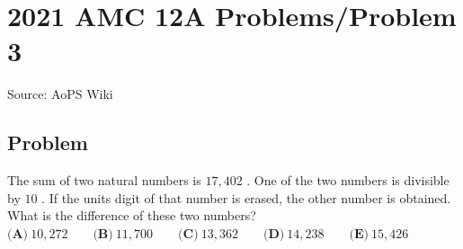 \documentclass[12pt]{article}
\begin{document}
\section*{{2021 AMC 12A Problems/Problem 3}}
Source: AoPS Wiki

\subsection*{Problem}
The sum of two natural numbers is $17{,}402$ . One of the two numbers is divisible by $10$ . If the units digit of that number is erased, the other number is obtained. What is the difference of these two numbers? $\textbf{(A)} ~10{,}272\qquad\textbf{(B)} ~11{,}700\qquad\textbf{(C)} ~13{,}362\qquad\textbf{(D)} ~14{,}238\qquad\textbf{(E)} ~15{,}426$
\end{document}
